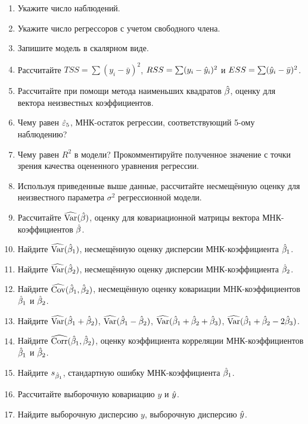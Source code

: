\begin{problem}
\begin{enumerate}
\item Укажите число наблюдений.
\item Укажите число регрессоров с учетом свободного члена.
\item Запишите модель в скалярном виде.
\item Рассчитайте $TSS=\sum (y_i-\bar{y})^2$, $RSS=\sum (y_i-\hat{y}_i)^2$ и $ESS=\sum (\hat{y}_i-\bar{y})^2$.
\item Рассчитайте при помощи метода наименьших квадратов $\hat{\beta}$, оценку для вектора неизвестных коэффициентов.
\item Чему равен $\hat{\varepsilon}_5$, МНК-остаток регрессии, соответствующий 5-ому наблюдению?
\item Чему равен $R^2$  в модели? Прокомментируйте полученное значение с точки зрения качества оцененного уравнения регрессии.
\item Используя приведенные выше данные, рассчитайте несмещённую оценку для неизвестного параметра $\sigma^2$ регрессионной модели.
\item Рассчитайте $\widehat{\operatorname{Var}}(\hat{\beta})$, оценку для ковариационной матрицы вектора МНК-коэффициентов $\hat{\beta}$.
\item Найдите $\widehat{\operatorname{Var}}(\hat{\beta}_1)$, несмещённую оценку дисперсии МНК-коэффициента $\hat{\beta}_1$.
\item Найдите $\widehat{\operatorname{Var}}(\hat{\beta}_2)$, несмещённую оценку дисперсии МНК-коэффициента $\hat{\beta}_2$.
\item Найдите $\widehat{\operatorname{Cov}}(\hat{\beta}_1,\hat{\beta}_2)$, несмещённую оценку ковариации МНК-коэффициентов $\hat{\beta}_1$ и $\hat{\beta}_2$.
\item Найдите $\widehat{\operatorname{Var}}(\hat{\beta}_1+\hat{\beta}_2)$, $\widehat{\operatorname{Var}}(\hat{\beta}_1-\hat{\beta}_2)$, $\widehat{\operatorname{Var}}(\hat{\beta}_1+\hat{\beta}_2+\hat{\beta}_3)$, $\widehat{\operatorname{Var}}(\hat{\beta}_1+\hat{\beta}_2-2\hat{\beta}_3)$.
\item Найдите $\widehat{\operatorname{Corr}}(\hat{\beta}_1,\hat{\beta}_2)$, оценку коэффициента корреляции МНК-коэффициентов $\hat{\beta}_1$ и $\hat{\beta}_2$.
\item Найдите $s_{\hat{\beta}_1}$, стандартную ошибку МНК-коэффициента $\hat{\beta}_1$.
\item Рассчитайте выборочную ковариацию $y$ и $\hat{y}$.
\item Найдите выборочную дисперсию $y$, выборочную дисперсию $\hat{y}$.
\end{enumerate}

\begin{sol}


\end{sol}
\end{problem}
